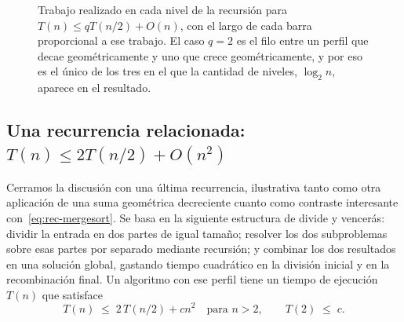 \documentclass[12pt, spanish, oneside, openany]{book}
\theoremstyle{uprightplain}
\theoremstyle{definition}
\theoremstyle{remark}
\theoremstyle{definition}
\begin{document}
\begin{figure}[H]
\centering
{}
\caption{Trabajo realizado en cada nivel de la recursión para
$T(n)\le qT(n/2)+O(n)$, con el largo de cada barra proporcional a ese trabajo.
El caso $q=2$ es el filo entre un perfil que decae geométricamente y uno que
crece geométricamente, y por eso es el único de los tres en el que la cantidad
de niveles, $\log_2 n$, aparece en el resultado.}
\label{fig:perfiles-q}
\end{figure}

\subsection{Una recurrencia relacionada: \texorpdfstring{$T(n)\le 2T(n/2)+O(n^2)$}{T(n)<=2T(n/2)+O(n^2)}}

Cerramos la discusión con una última recurrencia, ilustrativa tanto como otra aplicación de una suma geométrica decreciente cuanto como contraste interesante con~\eqref{eq:rec-mergesort}. Se basa en la siguiente estructura de divide y vencerás: dividir la entrada en dos partes de igual tamaño; resolver los dos subproblemas sobre esas partes por separado mediante recursión; y combinar los dos resultados en una solución global, gastando tiempo cuadrático en la división inicial y en la recombinación final. Un algoritmo con ese perfil tiene un tiempo de ejecución $T(n)$ que satisface
\begin{equation}
\label{eq:rec-cuadratica}
T(n) \;\le\; 2\,T(n/2) + cn^2 \quad \text{para } n>2, \qquad T(2) \;\le\; c .
\end{equation}
\end{document}
